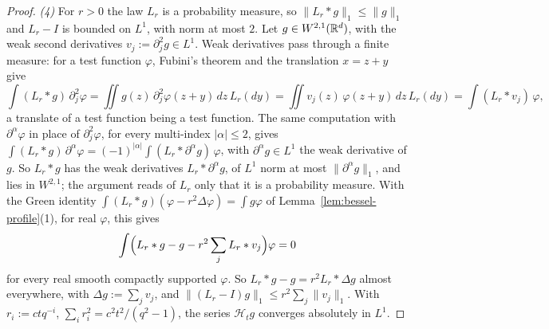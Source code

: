 \begin{proof}
\emph{(4)} For $r > 0$ the law $L_r$ is a probability measure, so $\|L_r * g\|_1 \le \|g\|_1$ and
$L_r - I$ is bounded on $L^1$, with norm at most $2$. Let $g \in W^{2,1}(\mathbb{R}^d)$, with the weak
second derivatives $v_j := \partial_j^2g \in L^1$. Weak derivatives pass through a finite measure:
for a test function $\varphi$, Fubini's theorem and the translation $x = z + y$ give
\[
  \int(L_r * g)\,\partial_j^2\varphi
   = \iint g(z)\,\partial_j^2\varphi(z + y)\,dz\,L_r(dy)
   = \iint v_j(z)\,\varphi(z + y)\,dz\,L_r(dy) = \int(L_r * v_j)\,\varphi ,
\]
a translate of a test function being a test function. The same computation with
$\partial^\alpha\varphi$ in place of $\partial_j^2\varphi$, for every multi-index $|\alpha| \le 2$,
gives $\int(L_r * g)\,\partial^\alpha\varphi = (-1)^{|\alpha|}\int(L_r * \partial^\alpha g)\,\varphi$,
with $\partial^\alpha g \in L^1$ the weak derivative of $g$. So $L_r * g$ has the weak derivatives
$L_r * \partial^\alpha g$, of $L^1$ norm at most $\|\partial^\alpha g\|_1$, and lies in
$W^{2,1}$; the argument reads of $L_r$ only that it is a probability measure. With the Green identity
$\int(L_r * g)(\varphi - r^2\Delta\varphi) = \int g\varphi$ of Lemma~\ref{lem:bessel-profile}(1),
for real $\varphi$, this gives
\[
  \int\Bigl(L_r * g - g - r^2\sum_jL_r * v_j\Bigr)\varphi = 0
\]
for every real smooth compactly supported $\varphi$. So $L_r * g - g = r^2L_r * \Delta g$ almost
everywhere, with $\Delta g := \sum_jv_j$, and $\|(L_r - I)g\|_1 \le r^2\sum_j\|v_j\|_1$. With
$r_i := ctq^{-i}$, $\sum_ir_i^2 = c^2t^2/(q^2 - 1)$, the series $\mathcal{H}_tg$ converges
absolutely in $L^1$.


\end{proof}
